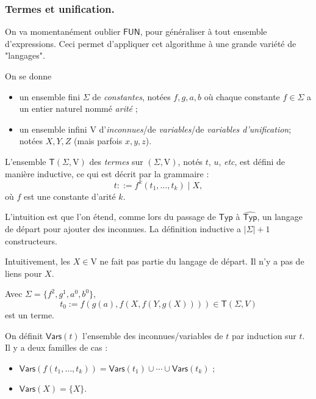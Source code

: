 \documentclass[../main]{subfiles}
\begin{document}
  \subsubsection{Termes et unification.}

  On va momentanément oublier $\mathsf{FUN}$, pour généraliser à tout ensemble d'expressions.
  Ceci permet d'appliquer cet algorithme à une grande variété de "langages".

  \begin{defn}
    On se donne
    \begin{itemize}
      \item un ensemble fini $\Sigma$ de  \textit{constantes}, notées $f, g, a, b$ où chaque constante  $f \in \Sigma$ a un entier naturel nommé \textit{arité} ;
      \item un ensemble infini $\mathrm{V}$ d'\textit{inconnues}/de \textit{variables}/de \textit{variables d'unification}; notées $X, Y, Z$ (mais parfois $x, y,z$).
    \end{itemize}

    L'ensemble $\mathsf{T}(\Sigma, \mathrm{V})$ des \textit{termes} sur $(\Sigma, \mathrm{V})$, notés  $t$, $u$, \textit{etc}, est défini de manière inductive, ce qui est décrit par la grammaire : \[
    t ::= f^k (t_1, \ldots, t_k) \mid X
    ,\] 
    où $f$ est une constante d'arité $k$.
  \end{defn}

  \begin{rmk}
    L'intuition est que l'on étend, comme lors du passage de $\mathsf{Typ}$ à $\widehat{\mathsf{Typ}}$, un langage de départ pour ajouter des inconnues.
    La définition inductive a $|\Sigma| + 1$ constructeurs.

    Intuitivement, les  $X \in \mathrm{V}$ ne fait pas partie du langage de départ.
    Il n'y a pas de liens pour $X$.
  \end{rmk}

  \begin{exm}
    Avec $\Sigma = \{f^2, g^1, a^0, b^0\}$, \[
      t_0 := f(g(a), f(X, f(Y, g(X)))) \in \mathsf{T}(\Sigma, V)
    \]
    est un terme.
  \end{exm}

  \begin{defn}
    On définit $\mathsf{Vars}(t)$ l'ensemble des inconnues/variables de $t$ par induction sur $t$.
    Il y a deux familles de cas :
    \begin{itemize}
      \item $\mathsf{Vars}(f(t_1, \ldots, t_k)) = \mathsf{Vars}(t_1) \cup \cdots \cup \mathsf{Vars}(t_k)$ ;
      \item $\mathsf{Vars}(X) = \{X\}$.
    \end{itemize}
  \end{defn}
\end{document}
